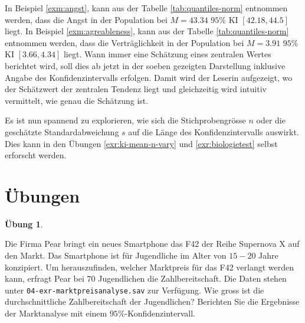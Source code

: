 \documentclass[
]{book}
\theoremstyle{definition}
\theoremstyle{definition}
\theoremstyle{definition}
\newtheorem{exercise}{Übung}[chapter]
\theoremstyle{definition}
\theoremstyle{remark}
\begin{document}
In Beispiel \ref{exm:angst}, kann aus der Tabelle \ref{tab:quantiles-norm} entnommen werden, dass die Angst in der Population bei \(M = 43.34\) \(95\%\) KI \([42.18,44.5]\) liegt. In Beispiel \ref{exm:agreableness}, kann aus der Tabelle \ref{tab:quantiles-norm} entnommen werden, dass die Verträglichkeit in der Population bei \(M = 3.91\) \(95\%\) KI \([3.66,4.34]\) liegt. Wann immer eine Schätzung eines zentralen Wertes berichtet wird, soll dies ab jetzt in der soeben gezeigten Darstellung inklusive Angabe des Konfidenzintervalls erfolgen. Damit wird der Leserin aufgezeigt, wo der Schätzwert der zentralen Tendenz liegt und gleichzeitig wird intuitiv vermittelt, wie genau die Schätzung ist.

Es ist nun spannend zu explorieren, wie sich die Stichprobengrösse \(n\) oder die geschätzte Standardabweichung \(s\) auf die Länge des Konfidenzintervalls auswirkt. Dies kann in den Übungen \ref{exr:ki-mean-n-vary} und \ref{exr:biologietest} selbst erforscht werden.

\section{Übungen}\label{uxfcbungen-1}

\begin{exercise}
\protect\hypertarget{exr:marktpreisanalyse}{}\label{exr:marktpreisanalyse}\leavevmode

Die Firma Pear bringt ein neues Smartphone das F42 der Reihe Supernova X auf den Markt. Das Smartphone ist für Jugendliche im Alter von \(15-20\) Jahre konzipiert. Um herauszufinden, welcher Marktpreis für das F42 verlangt werden kann, erfragt Pear bei \(70\) Jugendlichen die Zahlbereitschaft. Die Daten stehen unter \texttt{04-exr-marktpreisanalyse.sav} zur Verfügung. Wie gross ist die durchschnittliche Zahlbereitschaft der Jugendlichen? Berichten Sie die Ergebnisse der Marktanalyse mit einem \(95\%\)-Konfidenzintervall.

\end{exercise}
\end{document}
